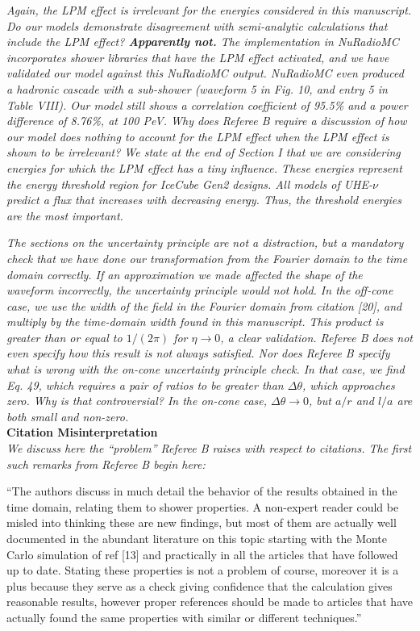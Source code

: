 \documentclass[12pt]{article}
\begin{document}
\textit{Again, the LPM effect is irrelevant for the energies considered in this manuscript.  Do our models demonstrate disagreement with semi-analytic calculations that include the LPM effect?  \textbf{Apparently not.}  The implementation in NuRadioMC incorporates shower libraries that have the LPM effect activated, and we have validated our model against this NuRadioMC output.  NuRadioMC even produced a hadronic cascade with a sub-shower (waveform 5 in Fig. 10, and entry 5 in Table VIII).  Our model still shows a correlation coefficient of 95.5\% and a power difference of 8.76\%, at 100 PeV.  Why does Referee B require a discussion of how our model does nothing to account for the LPM effect when the LPM effect is shown to be irrelevant?  We state at the end of Section I that we are considering energies for which the LPM effect has a tiny influence.  These energies represent the energy threshold region for IceCube Gen2 designs.  All models of UHE-$\nu$ predict a flux that increases with decreasing energy.  Thus, the threshold energies are the most important.}

\textit{The sections on the uncertainty principle are not a distraction, but a mandatory check that we have done our transformation from the Fourier domain to the time domain correctly.  If an approximation we made affected the shape of the waveform incorrectly, the uncertainty principle would not hold.  In the off-cone case, we use the width of the field in the Fourier domain from citation [20], and multiply by the time-domain width found in this manuscript.  This product is greater than or equal to $1/(2\pi)$ for $\eta \to 0$, a clear validation.  Referee B does not even specify how this result is not always satisfied.  Nor does Referee B specify what is wrong with the on-cone uncertainty principle check.  In that case, we find Eq. 49, which requires a pair of ratios to be greater than $\Delta\theta$, which approaches zero.  Why is that controversial?  In the on-cone case, $\Delta\theta \to 0$, but $a/r$ and $l/a$ are both small and non-zero.} \\

\textbf{Citation Misinterpretation} \\

\textit{We discuss here the ``problem'' Referee B raises with respect to citations.  The first such remarks from Referee B begin here:}

``The authors discuss in much detail the behavior of the results obtained in the time domain, relating them to shower properties. A non-expert reader could be misled into thinking these are new findings, but most of them are actually well documented in the abundant literature on this topic starting with the Monte Carlo simulation of ref [13] and practically in all the articles that have followed up to date. Stating these properties is not a problem of course, moreover it is a plus because they serve as a check giving confidence that the calculation gives reasonable results, however proper references should be made to articles that have actually found the same properties with similar or different techniques.''
\end{document}
